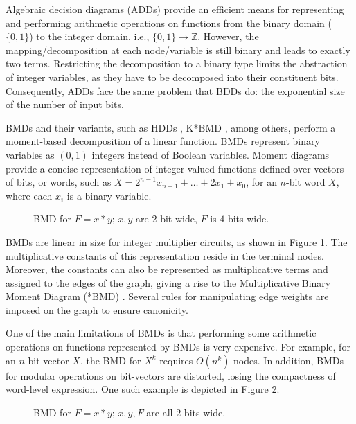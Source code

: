 Algebraic decision diagrams (ADDs) \cite{add} provide an efficient means for representing and performing arithmetic
operations on functions from the binary domain ($\{0,1\}$) to the integer domain, i.e., $\{0,1\} \rightarrow \mathbb{Z}$.
However, the mapping/decomposition at each node/variable is still binary and leads to exactly two terms. 
Restricting the decomposition to a binary type limits the abstraction of integer variables, 
as they have to be decomposed into their constituent bits. 
Consequently, ADDs face the same problem that BDDs do: the exponential size of the number of input bits.

BMDs \cite{bmd} and their
variants, such as HDDs \cite{hdd}, K*BMD \cite{kbmd}, among others,
perform a moment-based decomposition of a linear function. 
BMDs represent binary variables as $(0,1)$ integers instead of Boolean variables.
Moment diagrams provide a concise representation of integer-valued
functions defined over vectors of bits, or words, such as $X = 2^{n-1}
x_{n-1} + \ldots + 2 x_1 + x_0$, for an $n$-bit word $X$, where each
$x_i$ is a binary variable. 
\begin{figure}[b]
\epsfysize=5cm
\centerline{}
\caption{BMD for $F = x*y$; $x, y$ are 2-bit wide, $F$ is $4$-bits
  wide.}
\label{fig:bmd1}
\end{figure}
BMDs are linear in size for integer multiplier circuits, as shown in Figure \ref{fig:bmd1}.
The multiplicative constants of this representation reside in the terminal nodes.
Moreover, the constants can also be represented as multiplicative
terms and assigned to the edges of the graph, giving a rise to the
Multiplicative Binary Moment Diagram (*BMD) \cite{bmd}. Several rules
for manipulating edge weights are imposed on the graph to ensure canonicity. 

One of the main limitations of BMDs is that performing some arithmetic operations on functions 
represented by BMDs is very expensive.
For example, for an $n$-bit vector $X$, the BMD for $X^k$ requires $O(n^k)$ nodes. 
In addition, BMDs for modular operations on bit-vectors are distorted, losing the compactness of word-level expression.
One such example is depicted in Figure \ref{fig:bmd2}.

\begin{figure}[t]
\epsfysize=5cm
\centerline{}
\caption{BMD for $F = x*y$; $x, y, F$ are all $2$-bits wide.}
\label{fig:bmd2}
\end{figure}

